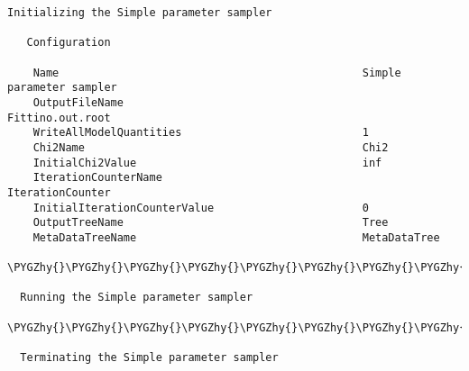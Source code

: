 \documentclass[letterpaper,10pt,english]{sphinxmanual}
\def\PYGZhy{\char`\-}
\begin{document}
\begin{Verbatim}[commandchars=\\\{\}]
  Initializing the Simple parameter sampler

   Configuration

    Name                                               Simple parameter sampler
    OutputFileName                                     Fittino.out.root
    WriteAllModelQuantities                            1
    Chi2Name                                           Chi2
    InitialChi2Value                                   inf
    IterationCounterName                               IterationCounter
    InitialIterationCounterValue                       0
    OutputTreeName                                     Tree
    MetaDataTreeName                                   MetaDataTree

\PYGZhy{}\PYGZhy{}\PYGZhy{}\PYGZhy{}\PYGZhy{}\PYGZhy{}\PYGZhy{}\PYGZhy{}\PYGZhy{}\PYGZhy{}\PYGZhy{}\PYGZhy{}\PYGZhy{}\PYGZhy{}\PYGZhy{}\PYGZhy{}\PYGZhy{}\PYGZhy{}\PYGZhy{}\PYGZhy{}\PYGZhy{}\PYGZhy{}\PYGZhy{}\PYGZhy{}\PYGZhy{}\PYGZhy{}\PYGZhy{}\PYGZhy{}\PYGZhy{}\PYGZhy{}\PYGZhy{}\PYGZhy{}\PYGZhy{}\PYGZhy{}\PYGZhy{}\PYGZhy{}\PYGZhy{}\PYGZhy{}\PYGZhy{}\PYGZhy{}\PYGZhy{}\PYGZhy{}\PYGZhy{}\PYGZhy{}\PYGZhy{}\PYGZhy{}\PYGZhy{}\PYGZhy{}\PYGZhy{}\PYGZhy{}\PYGZhy{}\PYGZhy{}\PYGZhy{}\PYGZhy{}\PYGZhy{}\PYGZhy{}\PYGZhy{}\PYGZhy{}\PYGZhy{}\PYGZhy{}\PYGZhy{}\PYGZhy{}\PYGZhy{}\PYGZhy{}\PYGZhy{}\PYGZhy{}\PYGZhy{}\PYGZhy{}\PYGZhy{}\PYGZhy{}\PYGZhy{}\PYGZhy{}\PYGZhy{}\PYGZhy{}\PYGZhy{}\PYGZhy{}\PYGZhy{}\PYGZhy{}\PYGZhy{}\PYGZhy{}\PYGZhy{}\PYGZhy{}\PYGZhy{}\PYGZhy{}\PYGZhy{}\PYGZhy{}\PYGZhy{}

  Running the Simple parameter sampler

\PYGZhy{}\PYGZhy{}\PYGZhy{}\PYGZhy{}\PYGZhy{}\PYGZhy{}\PYGZhy{}\PYGZhy{}\PYGZhy{}\PYGZhy{}\PYGZhy{}\PYGZhy{}\PYGZhy{}\PYGZhy{}\PYGZhy{}\PYGZhy{}\PYGZhy{}\PYGZhy{}\PYGZhy{}\PYGZhy{}\PYGZhy{}\PYGZhy{}\PYGZhy{}\PYGZhy{}\PYGZhy{}\PYGZhy{}\PYGZhy{}\PYGZhy{}\PYGZhy{}\PYGZhy{}\PYGZhy{}\PYGZhy{}\PYGZhy{}\PYGZhy{}\PYGZhy{}\PYGZhy{}\PYGZhy{}\PYGZhy{}\PYGZhy{}\PYGZhy{}\PYGZhy{}\PYGZhy{}\PYGZhy{}\PYGZhy{}\PYGZhy{}\PYGZhy{}\PYGZhy{}\PYGZhy{}\PYGZhy{}\PYGZhy{}\PYGZhy{}\PYGZhy{}\PYGZhy{}\PYGZhy{}\PYGZhy{}\PYGZhy{}\PYGZhy{}\PYGZhy{}\PYGZhy{}\PYGZhy{}\PYGZhy{}\PYGZhy{}\PYGZhy{}\PYGZhy{}\PYGZhy{}\PYGZhy{}\PYGZhy{}\PYGZhy{}\PYGZhy{}\PYGZhy{}\PYGZhy{}\PYGZhy{}\PYGZhy{}\PYGZhy{}\PYGZhy{}\PYGZhy{}\PYGZhy{}\PYGZhy{}\PYGZhy{}\PYGZhy{}\PYGZhy{}\PYGZhy{}\PYGZhy{}\PYGZhy{}\PYGZhy{}\PYGZhy{}\PYGZhy{}

  Terminating the Simple parameter sampler


\end{Verbatim}
\end{document}
